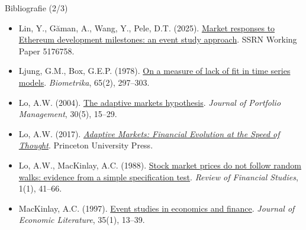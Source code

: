 \begin{frame}{Bibliografie (2/3)}
\begin{itemize}
    \item Lin, Y., Găman, A., Wang, Y., Pele, D.T. (2025). \href{https://doi.org/10.2139/ssrn.5176758}{Market responses to Ethereum development milestones: an event study approach}. SSRN Working Paper 5176758.
    \item Ljung, G.M., Box, G.E.P. (1978). \href{https://doi.org/10.1093/biomet/65.2.297}{On a measure of lack of fit in time series models}. \textit{Biometrika}, 65(2), 297--303.
    \item Lo, A.W. (2004). \href{https://doi.org/10.3905/jpm.2004.442611}{The adaptive markets hypothesis}. \textit{Journal of Portfolio Management}, 30(5), 15--29.
    \item Lo, A.W. (2017). \href{https://doi.org/10.1515/9781400887767}{\textit{Adaptive Markets: Financial Evolution at the Speed of Thought}}. Princeton University Press.
    \item Lo, A.W., MacKinlay, A.C. (1988). \href{https://doi.org/10.1093/rfs/1.1.41}{Stock market prices do not follow random walks: evidence from a simple specification test}. \textit{Review of Financial Studies}, 1(1), 41--66.
    \item MacKinlay, A.C. (1997). \href{https://ideas.repec.org/a/aea/jeclit/v35y1997i1p13-39.html}{Event studies in economics and finance}. \textit{Journal of Economic Literature}, 35(1), 13--39.
\end{itemize}
\end{frame}

